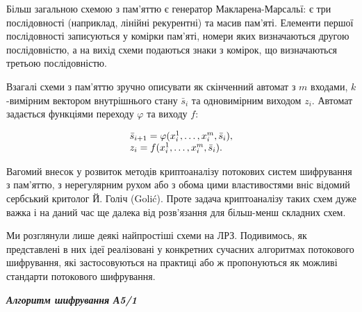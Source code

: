 Більш загальною схемою з пам’яттю є генератор Макларена-Марсальї: є три
послідовності (наприклад, лінійні рекурентні) та масив пам’яті. Елементи першої
послідовності записуються у комірки пам’яті, номери яких визначаються другою
послідовністю, а на вихід схеми подаються знаки з комірок, що визначаються
третьою послідовністю.

Взагалі схеми з пам’яттю зручно описувати як скінченний автомат з  ${m}$
входами,  ${k}${}-вимірним вектором внутрішнього стану  ${{\bar{{s}}}_{{i}}}$
та одновимірним виходом  ${z_{{i}}}$. Автомат задається функціями переходу 
${\varphi }$ та виходу  ${f}$:

\begin{equation*}
\begin{matrix}{{\bar{{s}}}_{{i+1}}=\varphi
(x_{{i}}^{{1}},\dots,x_{{i}}^{{m}},{\bar{{s}}}_{{i}}),}\hfill\null
\\z_{{i}}=f(x_{{i}}^{{1}},\dots,x_{{i}}^{{m}},{\bar{{s}}}_{{i}})\text{.}\hfill\null
\end{matrix}\hfill 
\end{equation*}

\bigskip

Вагомий внесок у розвиток методів криптоаналізу потокових систем шифрування з
пам’яттю, з нерегулярним рухом або з обома цими властивостями вніс відомий
сербський критолог Й. Голіч (Golić). Проте задача криптоаналізу таких схем дуже
важка і на даний час ще далека від розв’язання для більш-менш складних схем.

Ми розглянули лише деякі найпростіші схеми на ЛРЗ. Подивимось, як представлені в
них ідеї реалізовані у конкретних сучасних алгоритмах потокового шифрування,
які застосовуються на практиці або ж пропонуються як можливі стандарти
потокового шифрування.

{\centering\bfseries\itshape
Алгоритм шифрування А5/1
\par}


\bigskip

